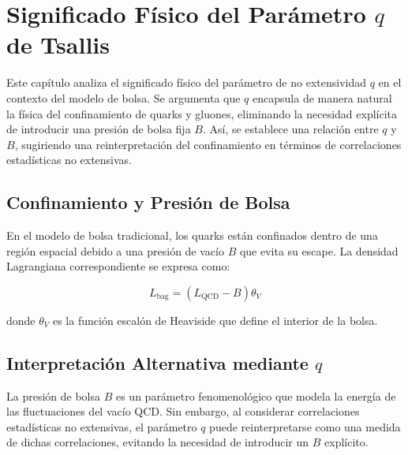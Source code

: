 \chapter{Significado F\'isico del Par\'ametro \( q \) de Tsallis}\label{ch-PhysicalMeaningQ}

\fancyhf{} %

\begin{chaptersummary}
Este cap\'itulo analiza el significado f\'isico del par\'ametro de no extensividad \( q \) en el contexto del modelo de bolsa. Se argumenta que \( q \) encapsula de manera natural la f\'isica del confinamiento de quarks y gluones, eliminando la necesidad expl\'icita de introducir una presi\'on de bolsa fija \( B \). As\'i, se establece una relaci\'on entre \( q \) y \( B \), sugiriendo una reinterpretaci\'on del confinamiento en t\'erminos de correlaciones estad\'isticas no extensivas.
\end{chaptersummary}

\section{Confinamiento y Presi\'on de Bolsa}
En el modelo de bolsa tradicional, los quarks est\'an confinados dentro de una regi\'on espacial debido a una presi\'on de vac\'io \( B \) que evita su escape. La densidad Lagrangiana correspondiente se expresa como:

\begin{equation}
{L}_{\mathrm{bag}} = \left( {L}_{\mathrm{QCD}} - B \right) \theta_V
\end{equation}

donde \( \theta_V \) es la funci\'on escal\'on de Heaviside que define el interior de la bolsa.

\section{Interpretaci\'on Alternativa mediante \( q \)}
La presi\'on de bolsa \( B \) es un par\'ametro fenomenol\'ogico que modela la energ\'ia de las fluctuaciones del vac\'io QCD. Sin embargo, al considerar correlaciones estad\'isticas no extensivas, el par\'ametro \( q \) puede reinterpretarse como una medida de dichas correlaciones, evitando la necesidad de introducir un \( B \) expl\'icito.

